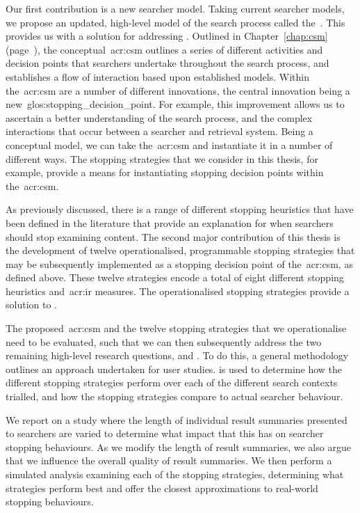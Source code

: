 \noindent
{} Our first contribution is a new searcher model. Taking current searcher models, we propose an updated, high-level model of the search process called the~. This provides us with a solution for addressing . Outlined in Chapter~\ref{chap:csm} (page~\pageref{chap:csm}), the conceptual~\gls{acr:csm} outlines a series of different activities and decision points that searchers undertake throughout the search process, and establishes a flow of interaction based upon established models. Within the~\gls{acr:csm} are a number of different innovations, the central innovation being a new~\gls{glos:stopping_decision_point}. For example, this improvement allows us to ascertain a better understanding of the search process, and the complex interactions that occur between a searcher and retrieval system. Being a conceptual model, we can take the~\gls{acr:csm} and instantiate it in a number of different ways. The stopping strategies that we consider in this thesis, for example, provide a means for instantiating stopping decision points within the~\gls{acr:csm}.

\noindent
{} As previously discussed, there is a range of different stopping heuristics that have been defined in the literature that provide an explanation for when searchers should stop examining content. The second major contribution of this thesis is the development of twelve operationalised, programmable stopping strategies that may be subsequently implemented as a stopping decision point of the~\gls{acr:csm}, as defined above. These twelve strategies encode a total of eight different stopping heuristics and~\gls{acr:ir} measures. The operationalised stopping strategies provide a solution to .

\noindent
{} The proposed~\gls{acr:csm} and the twelve stopping strategies that we operationalise need to be evaluated, such that we can then subsequently address the two remaining high-level research questions,  and . To do this, a general methodology outlines an approach undertaken for user studies.  is used to determine how the different stopping strategies perform over each of the different search contexts trialled, and how the stopping strategies compare to actual searcher behaviour.

\noindent
{} We report on a study where the length of individual result summaries presented to searchers are varied to determine what impact that this has on searcher stopping behaviours. As we modify the length of result summaries, we also argue that we influence the overall quality of result summaries. We then perform a simulated analysis examining each of the stopping strategies, determining what strategies perform best and offer the closest approximations to real-world stopping behaviours.

